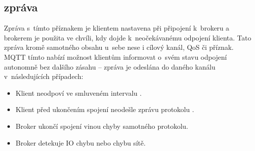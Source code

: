 \subsection{ zpráva}\label{subsec:last-will-zprava}
Zpráva s~tímto příznakem je klientem nastavena při připojení k~brokeru a brokerem je použita ve chvíli, kdy dojde
k~neočekávanému odpojení klienta.
Tato zpráva  kromě samotného obsahu u~sebe nese i cílový kanál, QoS či 
příznak.
MQTT tímto nabízí možnost klientům informovat o~svém stavu odpojení autonomně bez dalšího zásahu --
 zpráva je odeslána do daného kanálu v~následujících případech:
\begin{itemize}
    \item Klient neodpoví ve smluveném intervalu .
    \item Klient před ukončením spojení neodešle zprávu protokolu .
    \item Broker ukončí spojení vinou chyby samotného protokolu.
    \item Broker detekuje IO chybu nebo chybu sítě.
\end{itemize}

